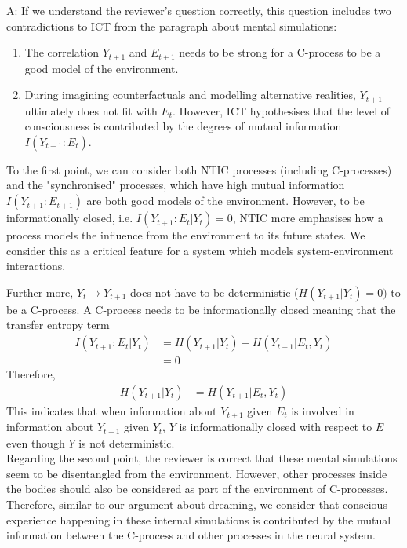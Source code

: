 \documentclass[utf8]{article}
\newenvironment{ans}  
    {\color{Black}\noindent A:}
    {~\newline}
\begin{document}
    	\begin{ans}
			If we understand the reviewer's question correctly, this question includes two contradictions to ICT from the paragraph about mental simulations: 
			\begin{enumerate}
				\item The correlation $Y_{t+1}$ and $E_{t+1}$ needs to be strong for a C-process to be a good model of the environment.
				\item During imagining counterfactuals and modelling alternative realities, $Y_{t+1}$ ultimately does not fit with $ E_t $. However, ICT hypothesises that the level of consciousness is contributed by the degrees of mutual information $I(Y_{t+1}:E_t)$.
			\end{enumerate}
			    		
    		To the first point, we can consider both NTIC processes (including C-processes) and the "synchronised" processes, which have high mutual information $I(Y_{t+1}:E_{t+1})$ are both good models of the environment. However, to be informationally closed, i.e. $I(Y_{t+1}:E_t|Y_t)=0$, NTIC more emphasises how a process models the influence from the environment to its future states. We consider this as a critical feature for a system which models system-environment interactions.
    		
    		Further more, $Y_t \rightarrow Y_{t+1}$ does not have to be deterministic ($H(Y_{t+1}|Y_t)=0)$ to be a C-process. A C-process needs to be informationally closed meaning that the transfer entropy term
    		\begin{align*}
    			I(Y_{t+1}:E_t|Y_t)&=H(Y_{t+1}|Y_t) - H(Y_{t+1}|E_t, Y_t)\\
    			&=0    			
   			\end{align*}
   			Therefore,
 			\begin{align*}
	   			 H(Y_{t+1}|Y_t)&=H(Y_{t+1}|E_t, Y_t)  			
   			\end{align*}
   			This indicates that when information about $Y_{t+1}$ given $E_t$ is involved in information about $Y_{t+1}$ given $Y_t$, $Y$ is informationally closed with respect to $E$ even though $Y$ is not deterministic. \\
   			
			Regarding the second point, the reviewer is correct that these mental simulations seem to be disentangled from the environment.  However, other processes inside the bodies should also be considered as part of the environment of C-processes. Therefore, similar to our argument about dreaming, we consider that conscious experience happening in these internal simulations is contributed by the mutual information between the C-process and other processes in the neural system. 
			

\end{ans}
\end{document}
